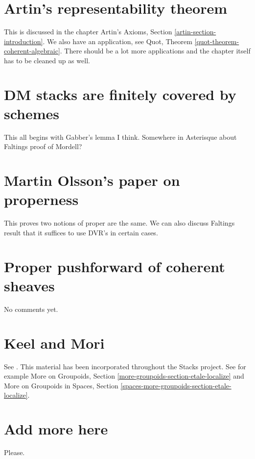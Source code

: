 \section{Artin's representability theorem}
\label{section-representability}

\noindent
This is discussed in the chapter
Artin's Axioms, Section \ref{artin-section-introduction}.
We also have an application, see
Quot, Theorem \ref{quot-theorem-coherent-algebraic}.
There should be a lot more applications and the chapter
itself has to be cleaned up as well.


\section{DM stacks are finitely covered by schemes}
\label{section-dm-finite-cover}

\noindent
This all begins with Gabber's lemma I think. Somewhere in Asterisque about
Faltings proof of Mordell?


\section{Martin Olsson's paper on properness}
\label{section-proper-parametrization}

\noindent
This proves two notions of proper are the same. We can also discuss Faltings
result that it suffices to use DVR's in certain cases.


\section{Proper pushforward of coherent sheaves}
\label{section-proper-pushforward}

\noindent
No comments yet.


\section{Keel and Mori}
\label{section-keel-mori}

\noindent
See \cite{K-M}. This material has been incorporated throughout the
Stacks project. See for example
More on Groupoids, Section \ref{more-groupoids-section-etale-localize}
and
More on Groupoids in Spaces, Section
\ref{spaces-more-groupoids-section-etale-localize}.


\section{Add more here}
\label{section-add-more}

\noindent
Please.









